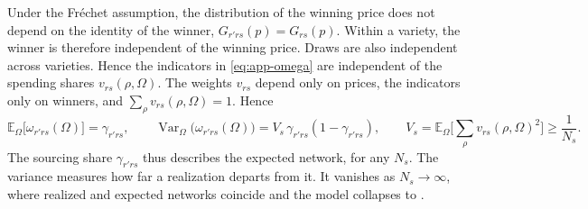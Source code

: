Under the Fréchet assumption, the distribution of the winning price does not depend on the identity of the winner, $G_{r'rs}(p)=G_{rs}(p)$. Within a variety, the winner is therefore independent of the winning price. Draws are also independent across varieties. Hence the indicators in \eqref{eq:app-omega} are independent of the spending shares $v_{rs}(\rho,\Omega)$. The weights $v_{rs}$ depend only on prices, the indicators only on winners, and $\sum_\rho v_{rs}(\rho,\Omega)=1$. Hence
\begin{equation}
\mathbb{E}_\Omega\big[\omega_{r'rs}(\Omega)\big]=\gamma_{r'rs},
\qquad
\operatorname{Var}_\Omega\big(\omega_{r'rs}(\Omega)\big)=V_s\,\gamma_{r'rs}(1-\gamma_{r'rs}),
\qquad
V_s=\mathbb{E}_\Omega\Big[\sum_\rho v_{rs}(\rho,\Omega)^2\Big]\ge \frac{1}{N_s}.
\label{eq:app-expected-share}
\end{equation}
The sourcing share $\gamma_{r'rs}$ thus describes the expected network, for any $N_s$. The variance measures how far a realization departs from it. It vanishes as $N_s\to\infty$, where realized and expected networks coincide and the model collapses to \cite{EatonKortum2002}.


